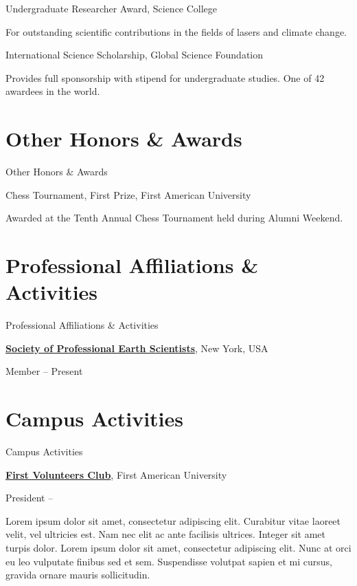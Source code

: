 \documentclass[a4paper,10pt,oneside]{article}
\begin{document}
\begin{body}
\nextentry
Undergraduate Researcher Award,
Science College
\hfill
{}
\begin{detail}
For outstanding scientific contributions in the fields of lasers and climate change.
\end{detail}

\nextentry
International Science Scholarship,
Global Science Foundation
\hfill
{}
\begin{detail}
Provides full sponsorship with stipend for undergraduate studies. One of 42 awardees in the world.
\end{detail}


\section{Other Honors \& Awards}
{Other Honors\newline
\& Awards}

Chess Tournament,
First Prize,
First American University
\hfill
{}
\begin{detail}
Awarded at the Tenth Annual Chess Tournament held during Alumni Weekend.
\end{detail}


\section{Professional Affiliations \& Activities}
{Professional Affiliations\newline
\& Activities}

\href{http://www.example.com/my-society}
{\textbf{Society of Professional Earth Scientists}},
New York, USA
\par
Member
\hfill
{} --
Present


\section{Campus Activities}
{Campus Activities}

\href{http://www.example.com/my-club}
{\textbf{First Volunteers Club}},
First American University
\par
President
\hfill
{} --
\begin{detail}
Lorem ipsum dolor sit amet, consectetur adipiscing elit. Curabitur vitae laoreet velit, vel ultricies est. Nam nec elit ac ante facilisis ultrices. Integer sit amet turpis dolor. Lorem ipsum dolor sit amet, consectetur adipiscing elit. Nunc at orci eu leo vulputate finibus sed et sem. Suspendisse volutpat sapien et mi cursus, gravida ornare mauris sollicitudin.
\end{detail}


\end{body}
\end{document}
